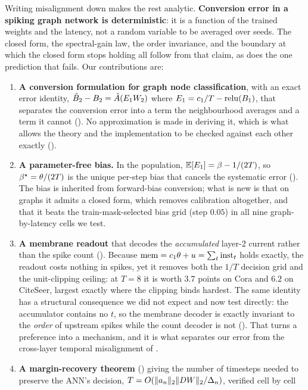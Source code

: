 Writing misalignment down makes the rest analytic. \textbf{Conversion error in a spiking graph
network is deterministic}: it is a function of the trained weights and the latency, not a random
variable to be averaged over seeds. The closed form, the spectral-gain law, the order invariance, and
the boundary at which the closed form stops holding all follow from that claim, as does the one
prediction that fails. Our contributions are:

\begin{enumerate}\itemsep2pt
\item \textbf{A conversion formulation for graph node classification}, with an exact error identity,
$\hat{B}_{2} - B_{2} = \hat{A}(E_{1} W_{2})$ where $E_{1} = c_{1}/T - \mathrm{relu}(B_{1})$, that
separates the conversion error into a term the neighbourhood averages and a term it cannot
(). No approximation is made in deriving it, which is what allows the theory and
the implementation to be checked against each other exactly ().
\item \textbf{A parameter-free bias.} In the population, $\mathbb{E}[E_{1}] = \beta - 1/(2T)$, so
$\beta^{\star} = \theta/(2T)$ is the unique per-step bias that cancels the systematic error
(). The bias is inherited from forward-bias conversion; what is new is that on
graphs it admits a closed form, which removes calibration altogether, and that it beats the
train-mask-selected bias grid (step $0.05$) in all nine graph-by-latency cells we test.
\item \textbf{A membrane readout} that decodes the \emph{accumulated} layer-2 current rather than the
spike count (). Because $\mathrm{mem} = c_{1}\theta + u = \sum_t
\mathrm{inst}_t$ holds exactly, the readout costs nothing in spikes, yet it removes both the $1/T$
decision grid and the unit-clipping ceiling: at $T=8$ it is worth $3.7$ points on Cora and $6.2$ on
CiteSeer, largest exactly where the clipping binds hardest. The same identity has a structural
consequence we did not expect and now test directly: the accumulator contains no $t$, so the
membrane decoder is exactly invariant to the \emph{order} of upstream spikes while the count
decoder is not (). That turns a preference into a mechanism, and it is what
separates our error from the cross-layer temporal misalignment of \citet{bojkovic2025temporal}.
\item \textbf{A margin-recovery theorem} () giving the number of timesteps needed to
preserve the ANN's decision, $T = O(\lVert a_{n}\rVert_{2} \lVert DW\rVert_{2} / \Delta_{n})$, verified cell by cell

\end{enumerate}

